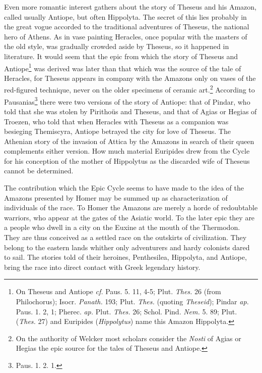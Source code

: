 \documentclass[a4paper, 12pt, oneside]{article}
\begin{document}
Even more romantic interest gathers about the story of Theseus and his Amazon, called usually Antiope, but often Hippolyta. The secret of this lies probably in the great vogue accorded to the traditional adventures of Theseus, the national hero of Athens. As in vase painting Heracles, once popular with the masters of the old style, was gradually crowded aside by Theseus, so it happened in literature. It would seem that the epic from which the story of Theseus and Antiope\footnote{On Theseus and Antiope \emph{cf.} Paus. 5. 11, 4-5; Plut. \emph{Thes.} 26 (from Philochorus); Isocr. \emph{Panath.} 193; Plut. \emph{Thes.} (quoting \emph{Theseid}); Pindar \emph{ap.} Paus. 1. 2, 1; Pherec. \emph{ap.} Plut. \emph{Thes.} 26; Schol. Pind. \emph{Nem.} 5. 89; Plut. (\emph{Thes.} 27) and Euripides (\emph{Hippolytus}) name this Amazon Hippolyta.} was derived was later than that which was the source of the tale of Heracles, for Theseus appears in company with the Amazons only on vases of the red-figured technique, never on the older specimens of ceramic art.\footnote{On the authority of Welcker most scholars consider the \emph{Nosti} of Agias or Hegias the epic source for the tales of Theseus and Antiope.} According to Pausanias\footnote{Paus. 1. 2. 1.} there were two versions of the story of Antiope: that of Pindar, who told that she was stolen by Pirithoüs and Theseus, and that of Agias or Hegias of Troezen, who told that when Heracles with Theseus as a companion was besieging Themiscyra, Antiope betrayed the city for love of Theseus. The Athenian story of the invasion of Attica by the Amazons in search of their queen complements either version. How much material Euripides drew from the Cycle for his conception of the mother of Hippolytus as the discarded wife of Theseus cannot be determined.

The contribution which the Epic Cycle seems to have made to the idea of the Amazons presented by Homer may be summed up as characterization of individuals of the race. To Homer the Amazons are merely a horde of redoubtable warriors, who appear at the gates of the Asiatic world. To the later epic they are a people who dwell in a city on the Euxine at the mouth of the Thermodon. They are thus conceived as a settled race on the outskirts of civilization. They belong to the eastern lands whither only adventurers and hardy colonists dared to sail. The stories told of their heroines, Penthesilea, Hippolyta, and Antiope, bring the race into direct contact with Greek legendary history.
\end{document}
